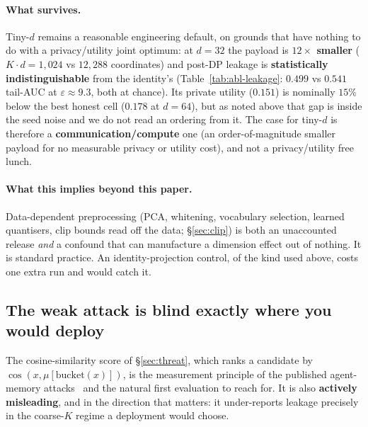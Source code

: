 \documentclass[pdflatex,sn-mathphys-num,12pt]{sn-jnl}
\theoremstyle{thmstyleone}%
\theoremstyle{thmstyletwo}%
\theoremstyle{thmstylethree}%
\newcommand{\eps}{\varepsilon}
\newcommand{\secref}[1]{\S\ref{#1}}
\begin{document}
\paragraph{What survives.} Tiny-$d$ remains a reasonable engineering default, on grounds
that have nothing to do with a privacy/utility joint optimum: at $d = 32$ the payload is
\textbf{$12\times$ smaller} ($K \cdot d = 1{,}024$ vs $12{,}288$ coordinates) and post-DP
leakage is \textbf{statistically indistinguishable} from the identity's
(Table~\ref{tab:abl-leakage}: $0.499$ vs $0.541$ tail-AUC at $\eps \approx 9.3$, both at
chance). Its private utility ($0.151$) is nominally $15\%$ below the best honest cell
($0.178$ at $d = 64$), but as noted above that gap is inside the seed noise and we do not
read an ordering from it. The case for tiny-$d$ is therefore a \textbf{communication/compute}
one (an order-of-magnitude smaller payload for no measurable privacy or utility cost),
and not a privacy/utility free lunch.

\paragraph{What this implies beyond this paper.} Data-dependent preprocessing (PCA,
whitening, vocabulary selection, learned quantisers, clip bounds read off the data;
\secref{sec:clip}) is both an unaccounted release \emph{and} a confound that can
manufacture a dimension effect out of nothing. It is standard practice. An
identity-projection control, of the kind used above, costs one extra run and would catch it.

\subsection{The weak attack is blind exactly where you would deploy}\label{sec:proxy-blind}

The cosine-similarity score of \secref{sec:threat}, which ranks a candidate by
$\cos(x, \mu[\mathrm{bucket}(x)])$, is the measurement principle of the published
agent-memory attacks~\cite{wang2025mextra, chen2026mrmmia} and the natural first
evaluation to reach for. It is also \textbf{actively misleading}, and in the direction that
matters: it under-reports leakage precisely in the coarse-$K$ regime a deployment would
choose.
\end{document}
